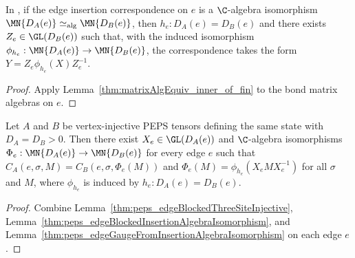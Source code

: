 \begin{lemma}%
    \label{thm:peps_edgeGaugeFromInsertionAlgebraIsomorphism}
    \leanok
    In \cite[Section~3]{Molnar2018NormalPEPS}, if the edge insertion correspondence on $e$ is a $\C$-algebra isomorphism $\MN{D_A(e)}\simeq_{\mathrm{alg}}\MN{D_B(e)}$, then $h_e:D_A(e)=D_B(e)$ and there exists $Z_e\in\GL(D_B(e))$ such that, with the induced isomorphism $\phi_{h_e}:\MN{D_A(e)}\to\MN{D_B(e)}$, the correspondence takes the form
    $Y=Z_e\phi_{h_e}(X)Z_e^{-1}$.
\end{lemma}
\begin{proof}\leanok
    Apply Lemma~\ref{thm:matrixAlgEquiv_inner_of_fin} to the bond matrix algebras on $e$.
\end{proof}

\begin{lemma}%
    \label{thm:peps_exists_edgeGaugeFamily}
    \leanok
    Let $A$ and $B$ be vertex-injective PEPS tensors defining the same state with $D_A=D_B>0$. Then there exist $X_e\in\GL(D_A(e))$ and $\C$-algebra isomorphisms $\Phi_e:\MN{D_A(e)}\to\MN{D_B(e)}$ for every edge $e$ such that $C_A(e,\sigma,M)=C_B(e,\sigma,\Phi_e(M))$ and $\Phi_e(M)=\phi_{h_e}(X_eMX_e^{-1})$ for all $\sigma$ and $M$, where $\phi_{h_e}$ is induced by $h_e:D_A(e)=D_B(e)$.
\end{lemma}
\begin{proof}\leanok
    Combine Lemma~\ref{thm:peps_edgeBlockedThreeSiteInjective}, Lemma~\ref{thm:peps_edgeBlockedInsertionAlgebraIsomorphism}, and Lemma~\ref{thm:peps_edgeGaugeFromInsertionAlgebraIsomorphism} on each edge $e$.
\end{proof}


